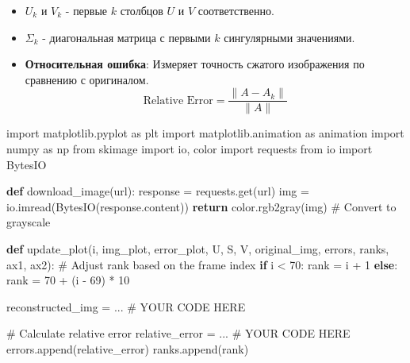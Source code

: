 \documentclass[
  russian,
  letterpaper,
  DIV=11,
  numbers=noendperiod]{scrartcl}
\newenvironment{Shaded}{\begin{snugshade}}{\end{snugshade}}
\newcommand{\CommentTok}[1]{\textcolor[rgb]{0.37,0.37,0.37}{#1}}
\newcommand{\ControlFlowTok}[1]{\textcolor[rgb]{0.00,0.23,0.31}{\textbf{#1}}}
\newcommand{\DecValTok}[1]{\textcolor[rgb]{0.68,0.00,0.00}{#1}}
\newcommand{\ImportTok}[1]{\textcolor[rgb]{0.00,0.46,0.62}{#1}}
\newcommand{\KeywordTok}[1]{\textcolor[rgb]{0.00,0.23,0.31}{\textbf{#1}}}
\newcommand{\NormalTok}[1]{\textcolor[rgb]{0.00,0.23,0.31}{#1}}
\newcommand{\OperatorTok}[1]{\textcolor[rgb]{0.37,0.37,0.37}{#1}}
\providecommand{\tightlist}{%
  \setlength{\itemsep}{0pt}\setlength{\parskip}{0pt}}
\begin{document}
\begin{enumerate}
\begin{itemize}
    \begin{itemize}
    \tightlist
    \item
      \(U_k\) и \(V_k\) - первые \(k\) столбцов \(U\) и \(V\)
      соответственно.
    \item
      \(\Sigma_k\) - диагональная матрица с первыми \(k\) сингулярными
      значениями.
    \item
      \textbf{Относительная ошибка}: Измеряет точность сжатого
      изображения по сравнению с оригиналом. \[
        \text{Relative Error} = \frac{\| A - A_k \|}{\| A \|}
        \]
    \end{itemize}
  \end{itemize}

\begin{Shaded}
\begin{Highlighting}[]
\ImportTok{import}\NormalTok{ matplotlib.pyplot }\ImportTok{as}\NormalTok{ plt}
\ImportTok{import}\NormalTok{ matplotlib.animation }\ImportTok{as}\NormalTok{ animation}
\ImportTok{import}\NormalTok{ numpy }\ImportTok{as}\NormalTok{ np}
\ImportTok{from}\NormalTok{ skimage }\ImportTok{import}\NormalTok{ io, color}
\ImportTok{import}\NormalTok{ requests}
\ImportTok{from}\NormalTok{ io }\ImportTok{import}\NormalTok{ BytesIO}

\KeywordTok{def}\NormalTok{ download\_image(url):}
\NormalTok{    response }\OperatorTok{=}\NormalTok{ requests.get(url)}
\NormalTok{    img }\OperatorTok{=}\NormalTok{ io.imread(BytesIO(response.content))}
    \ControlFlowTok{return}\NormalTok{ color.rgb2gray(img)  }\CommentTok{\# Convert to grayscale}

\KeywordTok{def}\NormalTok{ update\_plot(i, img\_plot, error\_plot, U, S, V, original\_img, errors, ranks, ax1, ax2):}
    \CommentTok{\# Adjust rank based on the frame index}
    \ControlFlowTok{if}\NormalTok{ i }\OperatorTok{\textless{}} \DecValTok{70}\NormalTok{:}
\NormalTok{        rank }\OperatorTok{=}\NormalTok{ i }\OperatorTok{+} \DecValTok{1}
    \ControlFlowTok{else}\NormalTok{:}
\NormalTok{        rank }\OperatorTok{=} \DecValTok{70} \OperatorTok{+}\NormalTok{ (i }\OperatorTok{{-}} \DecValTok{69}\NormalTok{) }\OperatorTok{*} \DecValTok{10}

\NormalTok{    reconstructed\_img }\OperatorTok{=}\NormalTok{ ... }\CommentTok{\# YOUR CODE HERE }

    \CommentTok{\# Calculate relative error}
\NormalTok{    relative\_error }\OperatorTok{=}\NormalTok{ ... }\CommentTok{\# YOUR CODE HERE}
\NormalTok{    errors.append(relative\_error)}
\NormalTok{    ranks.append(rank)}


\end{Highlighting}
\end{Shaded}
\end{enumerate}
\end{document}
